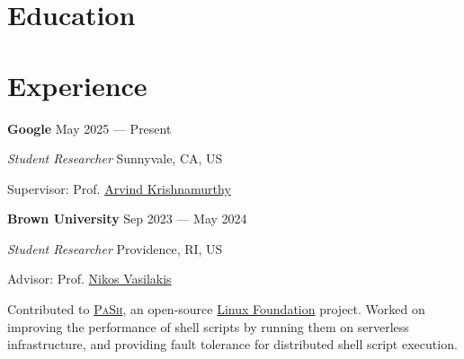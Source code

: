 \documentclass[margin,12pt]{resume}
\newcommand{\descriptionVSpace}{\vspace{0.5ex}\xspace}
\newcommand{\subsectionVSpace}{\vspace{3.5ex}\xspace}
\newcommand{\sectionVSpace}{\vspace{1ex}\xspace} %
\newcommand{\pash}{\textsc{PaSh}\xspace}
\newcommand{\sectionVSpaceCorrection}{\vspace{-3.5ex}} %
\newcommand{\header}[1]{\textbf{#1}\xspace}
\newcommand{\company}[1]{\header{#1}\xspace}
\newcommand{\interval}[2]{#1 --- #2\xspace}
\newcommand{\place}[1]{#1\xspace}
\newcommand{\role}[1]{\textit{#1}\xspace}
\newcommand{\stitle}[1]{#1:\xspace}
\newenvironment{rSubsection}{}{\par\subsectionVSpace}
\newenvironment{rSection}[1]{\sectionVSpaceCorrection\section{#1}\xspace}{\sectionVSpace\par}
\newenvironment{jobDuties}{\descriptionVSpace}{\par}
\begin{document}
\begin{resume}
\begin{rSection}{Education}
\begin{rSubsection}
        \end{rSubsection}
    \end{rSection}

    \begin{rSection}{Experience}
        \begin{rSubsection}
            \company{Google} \hfill \interval{May 2025}{Present}

            \role{Student Researcher} \hfill \place{Sunnyvale, CA, US}

            \stitle{Supervisor} Prof. \href{https://sites.google.com/cs.washington.edu/arvind}{Arvind Krishnamurthy}

        \end{rSubsection}

        \begin{rSubsection}
            \company{Brown University} \hfill \interval{Sep 2023}{May 2024}

            \role{Student Researcher} \hfill \place{Providence, RI, US}

            \stitle{Advisor} Prof. \href{https://nikos.vasilak.is}{Nikos Vasilakis}

            \begin{jobDuties}
                Contributed to \href{https://binpa.sh}{\pash}, an open-source \href{https://www.linuxfoundation.org/press/press-release/linux-foundation-to-host-the-pash-project-accelerating-shell-scripting-with-automated-parallelization-for-industrial-use-cases}{Linux Foundation} project.
                Worked on improving the performance of shell scripts by running them on serverless infrastructure, and providing fault tolerance for distributed shell script execution.
            \end{jobDuties}
        \end{rSubsection}





\end{rSection}
\end{resume}
\end{document}
